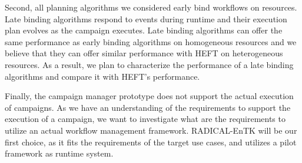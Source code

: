 Second, all planning algorithms we considered early bind workflows on resources.
Late binding algorithms respond to events during runtime and their execution
plan evolves as the campaign executes. Late binding algorithms can offer the
same performance as early binding algorithms on homogeneous resources and we
believe that they can offer similar performance with HEFT on heterogeneous
resources. As a result, we plan to characterize the performance of a late
binding algorithms and compare it with HEFT's performance.

Finally, the campaign manager prototype does not support the actual execution of
campaigns. As we have an understanding of the requirements to support the
execution of a campaign, we want to investigate what are the requirements to
utilize an actual workflow management framework. RADICAL-EnTK will be our
first choice, as it fits the requirements of the target use cases, and utilizes
a pilot framework as runtime system.
